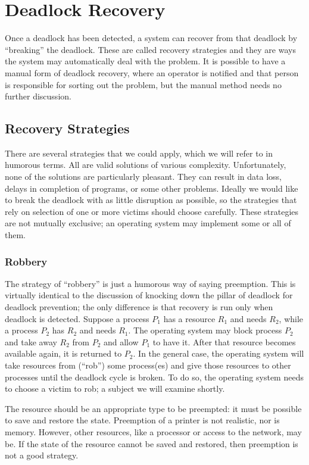 \documentclass[a4paper]{report}
\begin{document}
\section*{Deadlock Recovery}
Once a deadlock has been detected, a system can recover from that deadlock by ``breaking'' the deadlock. These are called recovery strategies and they are ways the system may automatically deal with the problem. It is possible to have a manual form of deadlock recovery, where an operator is notified and that person is responsible for sorting out the problem, but the manual method needs no further discussion.

\subsection*{Recovery Strategies}
There are several strategies that we could apply, which we will refer to in humorous terms. All are valid solutions of various complexity. Unfortunately, none of the solutions are particularly pleasant. They can result in data loss, delays in completion of programs, or some other problems.  Ideally we would like to break the deadlock with as little disruption as possible, so the strategies that rely on selection of one or more victims should choose carefully. These strategies are not mutually exclusive; an operating system may implement some or all of them.


\subsubsection*{Robbery}
The strategy of ``robbery'' is just a humorous way of saying preemption. This is virtually identical to the discussion of knocking down the pillar of deadlock for deadlock prevention; the only difference is that recovery is run only when deadlock is detected. Suppose a process $P_{1}$ has a resource $R_{1}$ and needs $R_{2}$, while a process $P_{2}$ has $R_{2}$ and needs $R_{1}$. The operating system may block process $P_{2}$ and take away $R_{2}$ from $P_{2}$ and allow $P_{1}$ to have it. After that resource becomes available again, it is returned to $P_{2}$. In the general case, the operating system will take resources from (``rob'') some process(es) and give those resources to other processes until the deadlock cycle is broken. To do so, the operating system needs to choose a victim to rob; a subject we will examine shortly.

The resource should be an appropriate type to be preempted: it must be possible to save and restore the state. Preemption of a printer is not realistic, nor is memory. However, other resources, like a processor or access to the network, may be. If the state of the resource cannot be saved and restored, then preemption is not a good strategy.
\end{document}
